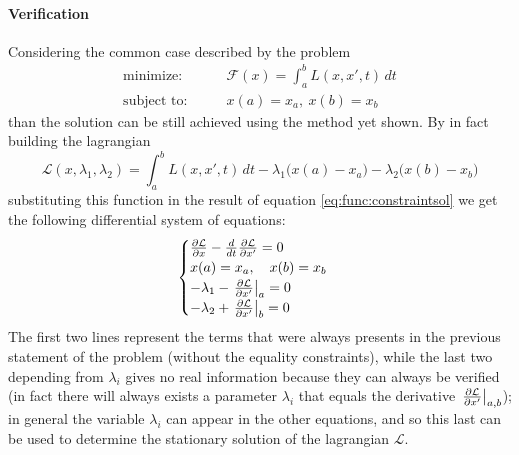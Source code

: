 	\paragraph{Verification} Considering the common case described by the problem
	\begin{align*} 
		\textrm{minimize:}& \qquad \mathcal F(x) = \int_a^b L (x,x',t)\, dt \\
		\textrm{subject to:}& \qquad x(a) = x_a, \ x(b) = x_b
	\end{align*}
	than the solution can be still achieved using the method yet shown. By in fact building the lagrangian 
	\[ \mathcal L   (x,\lambda_1,\lambda_2) = \int_a^b L (x,x',t)\, dt - \lambda_1\big(x(a)-x_a\big) -\lambda_2 \big(x(b) - x_b \big) \]
	substituting this function in the result of equation \ref{eq:func:constraintsol} we get the following differential system of equations:
	\[ \begin{cases}
		\frac{\partial \mathcal L  }{\partial x} - \frac d {dt}\frac{\partial \mathcal L  }{\partial x'} = 0 \\
		x(a) = x_a, \quad x(b) = x_b\\ 
		-\lambda_1 - \left. \frac{\partial \mathcal L  }{\partial x'} \right|_a = 0 \\
		-\lambda_2 + \left. \frac{\partial \mathcal L  }{\partial x'} \right|_b = 0 \\
	\end{cases} \]
	The first two lines represent the terms that were always presents in the previous statement of the problem (without the equality constraints), while the last two depending from $\lambda_i$ gives no real information because they can always be verified (in fact there will always exists a parameter $\lambda_i$  that equals the derivative $\left. \frac{\partial \mathcal L  }{\partial x'}\right|_{a,b}$); in general the variable $\lambda_i$ can appear in the other equations, and so this last can be used to determine the stationary solution of the lagrangian $\mathcal L  $.


























	




